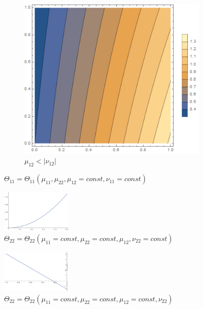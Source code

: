 \documentclass[12pt,a4]{article}
\begin{document}
\begin{figure}[!ht]
\begin{subfigure}[b]{0.3\textwidth}
	\end{subfigure}
	\hfill
	\begin{subfigure}[b]{0.3\textwidth}
		\centering
		\includegraphics[width=\textwidth]{Joonised/Theta22Mu11Mu22III}
		\caption{$ \mu_{12} < | \nu_{12}| $}
	\end{subfigure}
	\caption{$ \Theta_{11} = \Theta_{11} (\mu_{11}, \mu_{22}, \mu_{12} = const, \nu_{11} = const) $}
\end{figure}
\begin{figure}[!ht]
	\centering
	\includegraphics[width=0.3\textwidth]{Joonised/Theta22Mu12}
	\caption{$ \Theta_{22} = \Theta_{22} (\mu_{11} = const, \mu_{22} = const, \mu_{12}, \nu_{22} = const) $}
\end{figure}
\begin{figure}[!ht]
	\centering
	\includegraphics[width=0.3\textwidth]{Joonised/Theta22Nu22I}
	\caption{$ \Theta_{22} = \Theta_{22} (\mu_{11} = const, \mu_{22} = const, \mu_{12} = const, \nu_{22}) $}
\end{figure}
\end{document}

